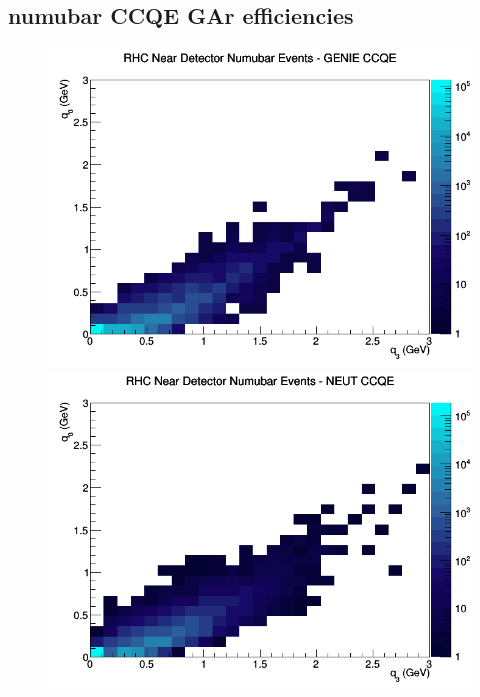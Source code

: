 \subsection{numubar CCQE GAr efficiencies}
\begin{figure}[h]
\includegraphics[width=\linewidth]{eff_q0_q3/GAr/CCQE_RHC_ND_numubar_q3_q0_GENIE.png}
\endminipage
{}
\includegraphics[width=\linewidth]{eff_q0_q3/GAr/CCQE_RHC_ND_numubar_q3_q0_NEUT.png}
\endminipage
{}

\end{figure}
